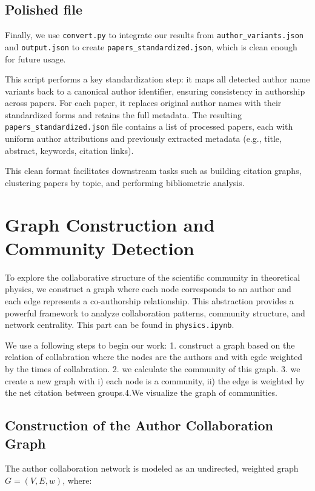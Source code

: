 \documentclass[12pt]{article}
\begin{document}
\subsection{Polished file}

Finally, we use \texttt{convert.py} to integrate our results from \texttt{author\_variants.json} and \texttt{output.json} to create \texttt{papers\_standardized.json}, which is clean enough for future usage.

This script performs a key standardization step: it maps all detected author name variants back to a canonical author identifier, ensuring consistency in authorship across papers. For each paper, it replaces original author names with their standardized forms and retains the full metadata. The resulting \texttt{papers\_standardized.json} file contains a list of processed papers, each with uniform author attributions and previously extracted metadata (e.g., title, abstract, keywords, citation links).

This clean format facilitates downstream tasks such as building citation graphs, clustering papers by topic, and performing bibliometric analysis.

\section{Graph Construction and Community Detection}

To explore the collaborative structure of the scientific community in theoretical physics, we construct a graph where each node corresponds to an author and each edge represents a co-authorship relationship. This abstraction provides a powerful framework to analyze collaboration patterns, community structure, and network centrality. This part can be found in \texttt{physics.ipynb}.

We use a following steps to begin our work:
1. construct a graph based on the relation of collabration where the nodes are the authors and with egde weighted by the times of collabration.
2. we calculate the community of this graph.
3. we create a new graph with i) each node is a community, ii) the edge is weighted by the net citation between groups.4.We visualize the graph of communities.

\subsection{Construction of the Author Collaboration Graph}

The author collaboration network is modeled as an undirected, weighted graph $G = (V, E, w)$, where:
\end{document}
